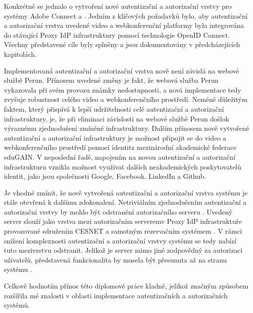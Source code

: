 \documentclass[
  printed, %
  twoside, %
  table,   %
  nolof,     %
  nolot,     %
]{fithesis3}
\begin{document}
\par 

Konkrétně se jednalo o vytvoření nové autentizační a autorizační vrstvy pro systémy Adobe Connect a . Jedním z klíčových požadavků bylo, aby autentizační a autorizační vrstva uvedené video a webkonferenční platformy byla integrována do stávající Proxy IdP infrastruktury pomocí technologie OpenID Connect. Všechny představené cíle byly splněny a jsou dokumentovány v předcházejících kapitolách. 

\par
Implementovaná autentizační a autorizační vrstva nově není závislá na webové službě Perun. Přínosem uvedené změny je fakt, že webová služba Perun vykazovala při svém provozu známky nedostupnosti, a nová implementace tedy zvyšuje robustnost celého video a webkonferenčního prostředí. Neméně důležitým faktem, který přispívá k lepší udržitelnosti celé autentizační a autorizační infrastruktury, je, že při eliminaci závislosti na webové službě Perun došlo\break k výraznému zjednodušení zmíněné infrastruktury. Dalším přínosem nově vytvořené autentizační a autorizační infrastruktury je možnost připojit se do video a webkonferenčního prostředí pomocí identit\break z mezinárodní akademické federace eduGAIN. V neposlední řadě, napojením na novou autentizační a autorizační infrastrukturu vznikla možnost využívat dalších neakademických poskytovatelů identit, jako jsou společnosti Google, Facebook, LinkedIn a Github. 

\par

Je vhodné zmínit, že nově vytvořená autentizační a autorizační vrstva systému  je stále otevřená k dalšímu zdokonalení. Netriviálním zjednodušením autentizační a autorizační vrstvy by mohlo být odstranění autorizačního serveru . Uvedený server slouží jako vrstva mezi autorizačním serverem\break v Proxy IdP infrastruktuře provozované sdružením CESNET a samotným rezervačním systémem . V rámci snížení komplexnosti autentizační a autorizační vrstvy systému  se tedy nabízí tuto mezivrstvu odstranit. Jelikož je server  mimo jiné zodpovědný za autorizaci uživatelů, představená funkcionalita by musela být přesunuta až na stranu systému . 

\par 

Celkově hodnotím přínos této diplomové práce kladně, jelikož značným způsobem rozšířila mé znalosti v oblasti implementace autentizačních a autorizačních systémů.
\end{document}
